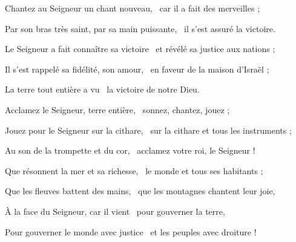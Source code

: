 \item Chantez au Seigneur un chant nouveau,~\psstar{} car il a fait des merveilles ; 
\item Par son bras très saint, par sa main puissante,~\psstar{} il s'est assuré la victoire.
\item Le Seigneur a fait connaître sa victoire~\psstar{} et révélé sa justice aux nations ;
\item Il s'est rappelé sa fidélité, son amour,~\psstar{} en faveur de la maison d'Israël ; 
\item La terre tout entière a vu~\psstar{} la victoire de notre Dieu.
\item Acclamez le Seigneur, terre entière,~\psstar{} sonnez, chantez, jouez ;
\item Jouez pour le Seigneur sur la cithare,~\psstar{} sur la cithare et tous les instruments ;
\item Au son de la trompette et du cor,~\psstar{} acclamez votre roi, le Seigneur !
\item Que résonnent la mer et sa richesse,~\psstar{} le monde et tous ses habitants ;
\item Que les fleuves battent des mains,~\psstar{} que les montagnes chantent leur joie,
\item À la face du Seigneur, car il vient~\psstar{} pour gouverner la terre,
\item Pour gouverner le monde avec justice~\psstar{} et les peuples avec droiture !
